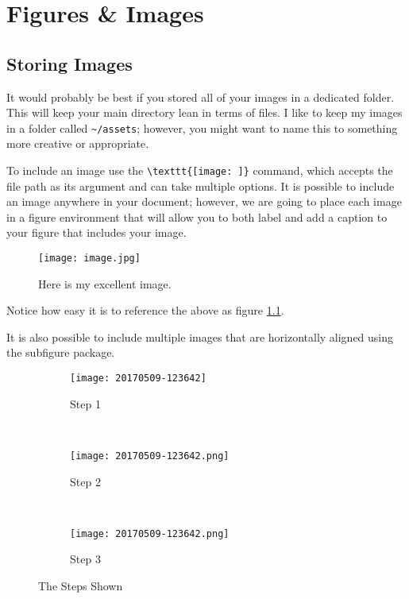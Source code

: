 \chapter{Figures \& Images}

\section{Storing Images}
It would probably be best if you stored all of your images in a dedicated 
folder.  This will keep your main directory lean in terms of files.
I like to keep my images in a folder called \verb!~/assets!; however, you 
might want to name this to something more creative or appropriate.

To include an image use the \verb!\texttt{[image: ]}! command, which accepts 
the file path as its argument and can take multiple options.  It is possible
to include an image anywhere in your document; however, we are
going to place each image in a figure environment that will allow you to both
label and add a caption to your figure that includes your image.

\begin{figure}[h]
    \begin{center}
    \texttt{[image: image.jpg]}
    \end{center}
    \caption{Here is my excellent image.}
    \label{fig:img001}
\end{figure}

Notice how easy it is to reference the above as figure \ref{fig:img001}.

It is also possible to include multiple images that are horizontally aligned
using the subfigure package.

\begin{figure}
    \centering
    \begin{subfigure}[b]{0.3\textwidth}
        \texttt{[image: 20170509-123642]}
        \caption{Step 1}
        \label{fig:step1}
    \end{subfigure}
    ~ %
    \begin{subfigure}[b]{0.3\textwidth}
        \texttt{[image: 20170509-123642.png]}
        \caption{Step 2}
        \label{fig:step2}
    \end{subfigure}
    ~ %
    \begin{subfigure}[b]{0.3\textwidth}
        \texttt{[image: 20170509-123642.png]}
        \caption{Step 3}
        \label{fig:step3}
    \end{subfigure}
    \caption{The Steps Shown}\label{fig:threesteps}
\end{figure}